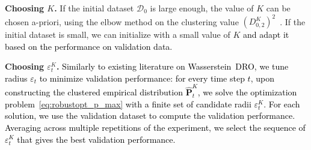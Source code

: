 \documentclass[12pt]{article}
\renewcommand{\paragraph}[1]{\textbf{#1.}\;}
\newcommand{\bnote}[1]{\textcolor{purple}{\textbf{[B: #1]}}}
\newcommand{\prob}{{\mathbf P}}
\newcommand{\eps}{\varepsilon^K}
\newcommand{\epsnom}{\varepsilon}
\newcommand{\RC}[1]{\textcolor{black}{#1}}
\newcommand{\RC}[1]{\textcolor{blue}{#1}}
\begin{document}
\paragraph{Choosing $K$}
If the initial dataset $\mathcal{D}_0$ is large enough, the value of $K$ can be chosen a-priori, using the elbow method on the clustering value $(D^K_{0,2})^2$~\cite{elbow,mro}.
If the initial dataset is small, we can initialize with a small value of $K$ \RC{and adapt it based on the performance on validation data.}

\paragraph{Choosing $\eps_t$}
\RC{Similarly to existing literature on Wasserstein~\gls{DRO}, we tune 
radius $\epsnom_t$ to minimize validation performance:
for every time step $t$, upon constructing the clustered empirical distribution $\hat{\prob}^K_t$, we solve the optimization problem~\eqref{eq:robustopt_p_max} with a finite set of candidate radii $\eps_t$.
For each solution, we use the validation dataset to compute the validation performance. 
Averaging across multiple repetitions of the experiment, we select the sequence of $\eps_t$ that gives the best validation performance.}



\end{document}
